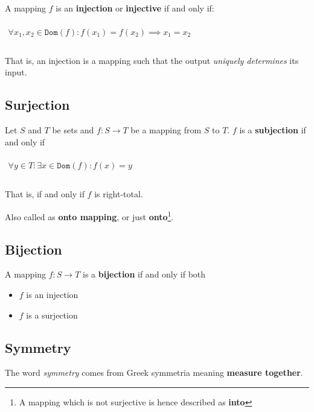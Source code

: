 A mapping $f$ is an \textbf{injection} or \textbf{injective} if and
only if:

\begin{math}
  \begin{array}{c}
    \\
    \forall x_1, x_2 \in \mathtt{Dom}(f): f(x_1) = f(x_2) \implies x_1 = x_2 \\
    \\
  \end{array}
\end{math}

That is, an injection is a mapping such that the output
\textit{uniquely determines} its input.

\subsection{Surjection}
\label{sec:surjection}

Let $S$ and $T$ be sets and $f : S \to T$ be a mapping from $S$ to
$T$. $f$ is a \textbf{subjection} if and only if

\begin{math}
  \begin{array}{c}
    \\
    \forall y \in T: \exists x \in \mathtt{Dom}(f) : f(x) = y\\
    \\
  \end{array}
\end{math}

That is, if and only if $f$ is right-total.

Also called as \textbf{onto mapping}, or just \textbf{onto}\footnote{A
  mapping which is not surjective is hence described as \textbf{into}}.


\subsection{Bijection}
\label{sec:bijection}

A mapping $f: S \to T$ is a \textbf{bijection} if and only if both
\begin{itemize}
\item $f$ is an injection
\item $f$ is a surjection
\end{itemize}



\subsection{Symmetry}
\label{sec:symmetry}
The word \textit{symmetry} comes from Greek symmetria meaning
\textbf{measure together}.

